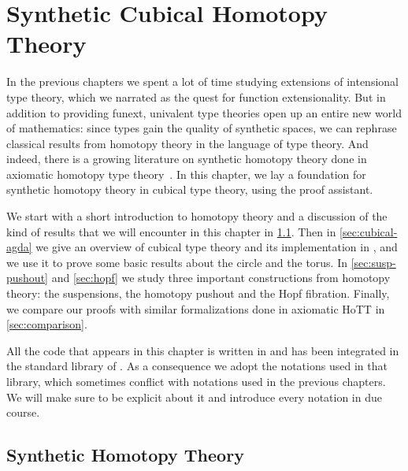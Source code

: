 \setchapterpreamble[u]{\margintoc}
\chapter{Synthetic Cubical Homotopy Theory}

In the previous chapters we spent a lot of time studying extensions of 
intensional type theory, which we narrated as the quest for function 
extensionality.
% 
But in addition to providing funext, univalent type theories open up an 
entire new world of mathematics: since types gain the quality of synthetic 
spaces, we can rephrase classical results from homotopy theory in the 
language of type theory.
% 
And indeed, there is a growing literature on synthetic homotopy theory done in 
axiomatic homotopy type theory~\cite{pi1s1,pinsn,Brunerie16,Cavallo15,seifertvankampen,BlakersMassey,vanDoorn18}.
% 
In this chapter, we lay a foundation for synthetic homotopy theory in cubical
type theory, using the \CubicalAgda proof assistant.

We start with a short introduction to homotopy theory and a discussion of the
kind of results that we will encounter in this chapter in \cref{sec:synthetic}.
% 
Then in \cref{sec:cubical-agda} we give an overview of cubical type theory and
its implementation in \CubicalAgda, and we use it to prove some basic 
results about the circle and the torus.
% 
In \cref{sec:susp-pushout} and \cref{sec:hopf} we study three important 
constructions from homotopy theory: the suspensions, the homotopy pushout and
the Hopf fibration.
% 
Finally, we compare our proofs with similar formalizations done in axiomatic
HoTT in \cref{sec:comparison}.

All the code that appears in this chapter is written in \Agda and has been
integrated in the standard library of \CubicalAgda. 
% 
As a consequence we adopt the notations used in that library, which sometimes
conflict with notations used in the previous chapters. 
% 
We will make sure to be explicit about it and introduce every notation in due 
course.

\section{Synthetic Homotopy Theory}
\label{sec:synthetic}

